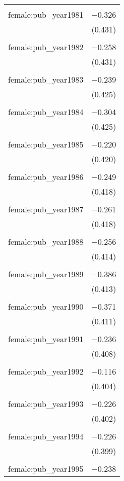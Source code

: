 \begin{table}[!htbp]
\begin{tabular}{@{\extracolsep{5pt}}lc}
  & \\ 
 female:pub\_year1981 & $-$0.326 \\ 
  & (0.431) \\ 
  & \\ 
 female:pub\_year1982 & $-$0.258 \\ 
  & (0.431) \\ 
  & \\ 
 female:pub\_year1983 & $-$0.239 \\ 
  & (0.425) \\ 
  & \\ 
 female:pub\_year1984 & $-$0.304 \\ 
  & (0.425) \\ 
  & \\ 
 female:pub\_year1985 & $-$0.220 \\ 
  & (0.420) \\ 
  & \\ 
 female:pub\_year1986 & $-$0.249 \\ 
  & (0.418) \\ 
  & \\ 
 female:pub\_year1987 & $-$0.261 \\ 
  & (0.418) \\ 
  & \\ 
 female:pub\_year1988 & $-$0.256 \\ 
  & (0.414) \\ 
  & \\ 
 female:pub\_year1989 & $-$0.386 \\ 
  & (0.413) \\ 
  & \\ 
 female:pub\_year1990 & $-$0.371 \\ 
  & (0.411) \\ 
  & \\ 
 female:pub\_year1991 & $-$0.236 \\ 
  & (0.408) \\ 
  & \\ 
 female:pub\_year1992 & $-$0.116 \\ 
  & (0.404) \\ 
  & \\ 
 female:pub\_year1993 & $-$0.226 \\ 
  & (0.402) \\ 
  & \\ 
 female:pub\_year1994 & $-$0.226 \\ 
  & (0.399) \\ 
  & \\ 
 female:pub\_year1995 & $-$0.238 \\ 

\end{tabular}
\end{table}
